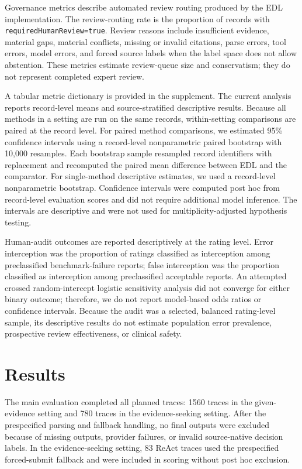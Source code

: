 \documentclass[11pt,a4paper]{article}
\begin{document}
Governance metrics describe automated review routing produced by the EDL implementation. The review-routing rate is the proportion of records with \texttt{requiredHumanReview=true}. Review reasons include insufficient evidence, material gaps, material conflicts, missing or invalid citations, parse errors, tool errors, model errors, and forced source labels when the label space does not allow abstention. These metrics estimate review-queue size and conservatism; they do not represent completed expert review.

A tabular metric dictionary is provided in the supplement. The current analysis reports record-level means and source-stratified descriptive results. Because all methods in a setting are run on the same records, within-setting comparisons are paired at the record level. For paired method comparisons, we estimated 95\% confidence intervals using a record-level nonparametric paired bootstrap with 10,000 resamples. Each bootstrap sample resampled record identifiers with replacement and recomputed the paired mean difference between EDL and the comparator. For single-method descriptive estimates, we used a record-level nonparametric bootstrap. Confidence intervals were computed post hoc from record-level evaluation scores and did not require additional model inference. The intervals are descriptive and were not used for multiplicity-adjusted hypothesis testing.

Human-audit outcomes are reported descriptively at the rating level. Error interception was the proportion of ratings classified as interception among preclassified benchmark-failure reports; false interception was the proportion classified as interception among preclassified acceptable reports. An attempted crossed random-intercept logistic sensitivity analysis did not converge for either binary outcome; therefore, we do not report model-based odds ratios or confidence intervals. Because the audit was a selected, balanced rating-level sample, its descriptive results do not estimate population error prevalence, prospective review effectiveness, or clinical safety.

\section{Results}

The main evaluation completed all planned traces: 1560 traces in the given-evidence setting and 780 traces in the evidence-seeking setting. After the prespecified parsing and fallback handling, no final outputs were excluded because of missing outputs, provider failures, or invalid source-native decision labels. In the evidence-seeking setting, 83 ReAct traces used the prespecified forced-submit fallback and were included in scoring without post hoc exclusion.
\end{document}
